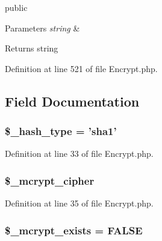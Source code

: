 public 
\begin{DoxyParams}{Parameters}
{\em string} & \\
\hline
\end{DoxyParams}
\begin{DoxyReturn}{Returns}
string 
\end{DoxyReturn}


Definition at line 521 of file Encrypt.\-php.



\subsection{Field Documentation}
\hypertarget{class_c_i___encrypt_a04e9d4ea0e45fc04c07aa1e291e17412}{
\subsubsection[{\$\-\_\-hash\-\_\-type}]{\setlength{\rightskip}{0pt plus 5cm}\$\-\_\-hash\-\_\-type = '{\bf sha1}'}}\label{class_c_i___encrypt_a04e9d4ea0e45fc04c07aa1e291e17412}


Definition at line 33 of file Encrypt.\-php.

\hypertarget{class_c_i___encrypt_ab2cdedd99c4818b191c667f5e081a2db}{
\subsubsection[{\$\-\_\-mcrypt\-\_\-cipher}]{\setlength{\rightskip}{0pt plus 5cm}\$\-\_\-mcrypt\-\_\-cipher}}\label{class_c_i___encrypt_ab2cdedd99c4818b191c667f5e081a2db}


Definition at line 35 of file Encrypt.\-php.

\hypertarget{class_c_i___encrypt_aaf4246798dad057cc4e294706e5e4e37}{
\subsubsection[{\$\-\_\-mcrypt\-\_\-exists}]{\setlength{\rightskip}{0pt plus 5cm}\$\-\_\-mcrypt\-\_\-exists = F\-A\-L\-S\-E}}\label{class_c_i___encrypt_aaf4246798dad057cc4e294706e5e4e37}


